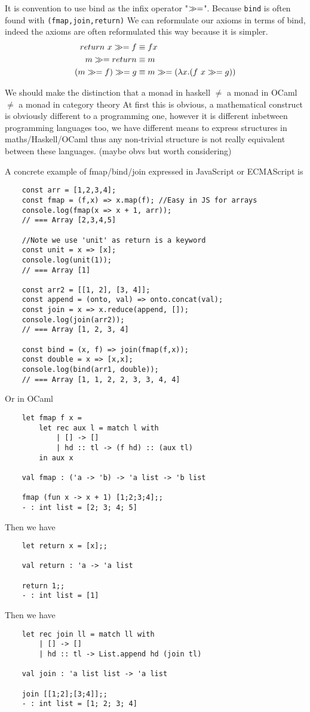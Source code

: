 It is convention to use bind as the infix operator "$\gg=$".
Because \texttt{bind} is often found with \texttt{(fmap,join,return)}
We can reformulate our axioms in terms of bind,
indeed the axioms are often reformulated this way because it is simpler.
\begin{align}
    return\ x \gg= f &\equiv f x \\
    m \gg= return &\equiv m \\
    (m \gg= f) \gg= g &\equiv m \gg= (\lambda x.(f\ x \gg= g))
\end{align}

We should make the distinction that
a monad in haskell $\neq$ a monad in OCaml $\neq$ a monad in category theory
At first this is obvious,
a mathematical construct is obviously different to a programming one,
however it is different inbetween programming languages too,
we have different means to express structures in maths/Haskell/OCaml
thus any non-trivial structure is not really equivalent between these languages.
(maybe obvs but worth considering)

A concrete example of fmap/bind/join expressed in JavaScript or ECMAScript is
\begin{verbatim}
    const arr = [1,2,3,4];
    const fmap = (f,x) => x.map(f); //Easy in JS for arrays
    console.log(fmap(x => x + 1, arr));
    // === Array [2,3,4,5]

    //Note we use 'unit' as return is a keyword
    const unit = x => [x];
    console.log(unit(1));
    // === Array [1]

    const arr2 = [[1, 2], [3, 4]];
    const append = (onto, val) => onto.concat(val);
    const join = x => x.reduce(append, []);
    console.log(join(arr2));
    // === Array [1, 2, 3, 4]

    const bind = (x, f) => join(fmap(f,x));
    const double = x => [x,x];
    console.log(bind(arr1, double));
    // === Array [1, 1, 2, 2, 3, 3, 4, 4]
\end{verbatim}


Or in OCaml
\begin{verbatim}
    let fmap f x =
        let rec aux l = match l with
            | [] -> []
            | hd :: tl -> (f hd) :: (aux tl)
        in aux x

    val fmap : ('a -> 'b) -> 'a list -> 'b list

    fmap (fun x -> x + 1) [1;2;3;4];;
    - : int list = [2; 3; 4; 5]
\end{verbatim}
Then we have
\begin{verbatim}
    let return x = [x];;

    val return : 'a -> 'a list

    return 1;;
    - : int list = [1]
\end{verbatim}
Then we have
\begin{verbatim}
    let rec join ll = match ll with
        | [] -> []
        | hd :: tl -> List.append hd (join tl)

    val join : 'a list list -> 'a list

    join [[1;2];[3;4]];;
    - : int list = [1; 2; 3; 4]
\end{verbatim}



